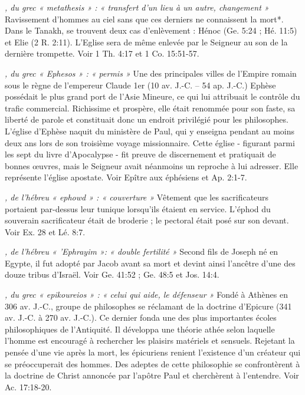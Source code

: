 \begin{multicols}{2}
\textit{, du grec « metathesis » : « transfert d'un lieu à un autre, changement »}\newline
Ravissement d'hommes au ciel sans que ces derniers ne connaissent la mort*. Dans le Tanakh, se trouvent deux cas d'enlèvement : Hénoc (Ge. 5:24 ; Hé. 11:5) et Elie (2 R. 2:11). L'Eglise sera de même enlevée par le Seigneur au son de la dernière trompette. Voir 1 Th. 4:17 et 1 Co. 15:51-57.

\textit{, du grec « Ephesos » : « permis »}\newline
Une des principales villes de l'Empire romain sous le règne de l'empereur Claude 1er (10 av. J.-C. – 54 ap. J.-C.) Ephèse possédait le plus grand port de l'Asie Mineure, ce qui lui attribuait le contrôle du trafic commercial. Richissime et prospère, elle était renommée pour son faste, sa liberté de parole et constituait donc un endroit privilégié pour les philosophes. L'église d'Ephèse naquit du ministère de Paul, qui y enseigna pendant au moins deux ans lors de son troisième voyage missionnaire. Cette église - figurant parmi les sept du livre d'Apocalypse - fit preuve de discernement et pratiquait de bonnes œuvres, mais le Seigneur avait néanmoins un reproche à lui adresser. Elle représente l'église apostate. Voir Epître aux éphésiens et Ap. 2:1-7.

\textit{, de l'hébreu « ephowd » : « couverture »}\newline
Vêtement que les sacrificateurs portaient par-dessus leur tunique lorsqu'ils étaient en service. L'éphod du souverain sacrificateur était de broderie ; le pectoral était posé sur son devant. Voir Ex. 28 et Lé. 8:7.

\textit{, de l'hébreu « 'Ephrayim »: « double fertilité »}\newline
Second fils de Joseph né en Egypte, il fut adopté par Jacob avant sa mort et devint ainsi l'ancêtre d'une des douze tribus d'Israël. Voir Ge. 41:52 ; Ge. 48:5 et Jos. 14:4.

\textit{, du grec « epikoureios » : « celui qui aide, le défenseur »}\newline
Fondé à Athènes en 306 av. J.-C., groupe de philosophes se réclamant de la doctrine d'Epicure (341 av. J.-C. à 270 av. J.-C.). Ce dernier fonda une des plus importantes écoles philosophiques de l'Antiquité. Il développa une théorie athée selon laquelle l'homme est encouragé à rechercher les plaisirs matériels et sensuels. Rejetant la pensée d'une vie après la mort, les épicuriens renient l'existence d'un créateur qui se préoccuperait des hommes. Des adeptes de cette philosophie se confrontèrent à la doctrine de Christ annoncée par l'apôtre Paul et cherchèrent à l'entendre. Voir Ac. 17:18-20.


\end{multicols}
